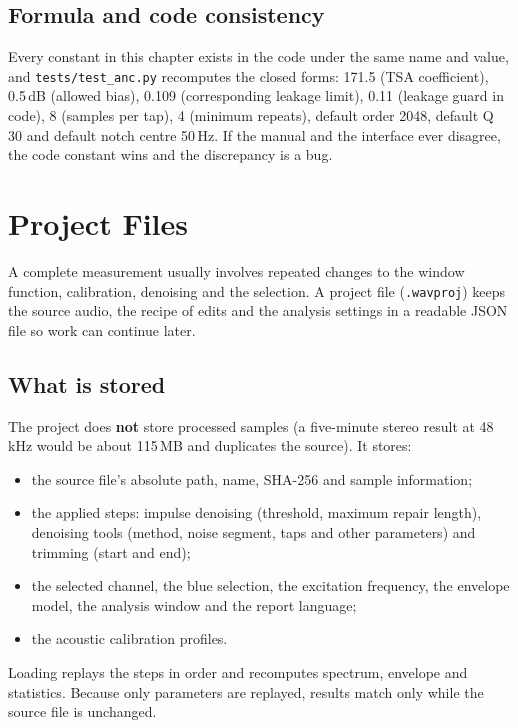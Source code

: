 \documentclass[UTF8,a4paper,12pt]{ctexart}
\begin{document}
\subsection{Formula and code consistency}

Every constant in this chapter exists in the code under the same name and value, and \texttt{tests/test\_anc.py} recomputes the closed forms: 171.5 (TSA coefficient), 0.5\,dB (allowed bias), 0.109 (corresponding leakage limit), 0.11 (leakage guard in code), 8 (samples per tap), 4 (minimum repeats), default order 2048, default Q 30 and default notch centre 50\,Hz. If the manual and the interface ever disagree, the code constant wins and the discrepancy is a bug.

\section{Project Files}

A complete measurement usually involves repeated changes to the window function, calibration, denoising and the selection. A project file (\texttt{.wavproj}) keeps the source audio, the recipe of edits and the analysis settings in a readable JSON file so work can continue later.

\subsection{What is stored}

The project does \textbf{not} store processed samples (a five-minute stereo result at 48\,kHz would be about 115\,MB and duplicates the source). It stores:

\begin{itemize}[leftmargin=2em]
  \item the source file's absolute path, name, SHA-256 and sample information;
  \item the applied steps: impulse denoising (threshold, maximum repair length), denoising tools (method, noise segment, taps and other parameters) and trimming (start and end);
  \item the selected channel, the blue selection, the excitation frequency, the envelope model, the analysis window and the report language;
  \item the acoustic calibration profiles.
\end{itemize}

Loading replays the steps in order and recomputes spectrum, envelope and statistics. Because only parameters are replayed, results match only while the source file is unchanged.
\end{document}
